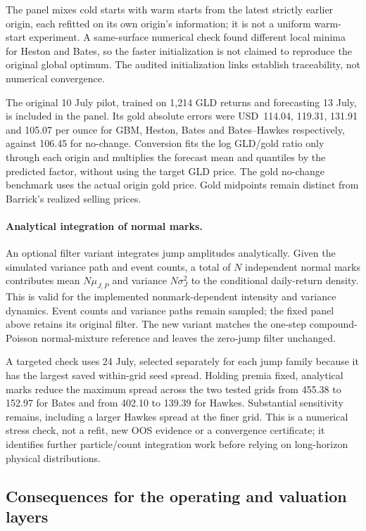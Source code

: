 The panel mixes cold starts with warm starts from the latest strictly
earlier origin, each refitted on its own origin's information; it is not a
uniform warm-start experiment. A same-surface numerical check found different
local minima for Heston and Bates, so the faster initialization is not claimed
to reproduce the original global optimum. The audited initialization links
establish traceability, not numerical convergence.

The original 10 July pilot, trained on 1,214 GLD returns and forecasting
13 July, is included in the panel. Its gold absolute errors were
USD~114.04, 119.31, 131.91 and 105.07 per ounce for GBM, Heston, Bates
and Bates--Hawkes respectively,
against 106.45 for no-change. Conversion fits the log GLD/gold ratio only
through each origin and multiplies the forecast mean and quantiles by the
predicted factor, without using the target GLD price. The gold no-change
benchmark uses the actual origin gold price. Gold midpoints remain distinct
from Barrick's realized selling prices.

\paragraph{Analytical integration of normal marks.}
An optional filter variant integrates jump amplitudes analytically. Given
the simulated variance path and event counts, a total of $N$ independent
normal marks contributes mean $N\mu_{J,P}$ and variance $N\sigma_J^2$ to
the conditional daily-return density. This is valid for the implemented
nonmark-dependent intensity and variance dynamics. Event counts and
variance paths remain sampled; the fixed panel above retains its original
filter. The new variant matches the one-step compound-Poisson normal-mixture
reference and leaves the zero-jump filter unchanged.

A targeted check uses 24 July, selected separately for each jump family
because it has the largest saved within-grid seed spread. Holding premia
fixed, analytical marks reduce the maximum spread across the two tested
grids from 455.38 to 152.97 for Bates and from 402.10 to 139.39 for Hawkes.
Substantial sensitivity remains, including a larger Hawkes spread at the
finer grid. This is a numerical stress check, not a refit, new OOS evidence
or a convergence certificate; it identifies further particle/count
integration work before relying on long-horizon physical distributions.

\subsection{Consequences for the operating and valuation layers}

